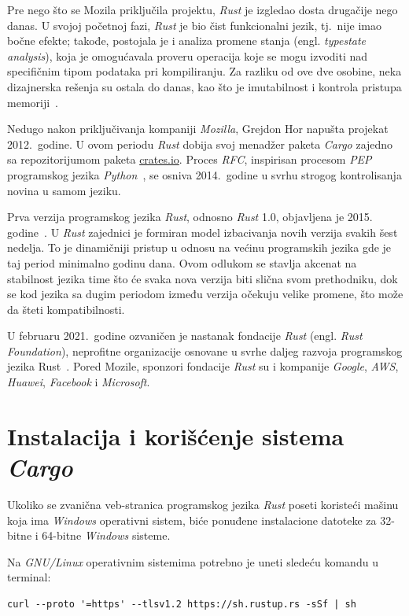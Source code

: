 \documentclass[12pt,oneside]{memoir}
\begin{document}
Pre nego što se Mozila priključila projektu, \emph{Rust} je izgledao dosta
drugačije nego danas. U svojoj početnoj fazi, \emph{Rust} je bio čist funkcionalni jezik,
tj.\ nije imao bočne efekte; takođe, postojala je i analiza promene stanja
(engl. \emph{typestate analysis}), koja je omogućavala proveru operacija
koje se mogu izvoditi nad specifičnim tipom podataka pri kompiliranju. Za
razliku od ove dve osobine, neka dizajnerska rešenja su ostala do danas, kao
što je imutabilnost i kontrola pristupa memoriji~\cite{history_rust}.

Nedugo nakon priključivanja kompaniji \textit{Mozilla}, Grejdon Hor napušta projekat
2012.\ godine. U ovom periodu \emph{Rust} dobija svoj menadžer
paketa \emph{Cargo} zajedno sa repozitorijumom paketa \url{crates.io}.
Proces \emph{RFC}, inspirisan procesom \emph{PEP} programskog jezika
\emph{Python}~\cite{python_pep}, se
osniva 2014.\ godine u svrhu strogog kontrolisanja novina u samom jeziku.

Prva verzija programskog jezika \emph{Rust}, odnosno \emph{Rust} 1.0, objavljena je 2015.
godine~\cite{stable_rust}. U \emph{Rust} zajednici je formiran model izbacivanja novih
verzija svakih šest nedelja. To je dinamičniji pristup
u odnosu na većinu programskih jezika gde je taj period minimalno godinu dana.
Ovom odlukom se stavlja akcenat na stabilnost jezika time što će svaka nova
verzija biti slična svom prethodniku, dok se kod jezika sa dugim periodom
između verzija očekuju velike promene, što može da šteti kompatibilnosti.

U februaru 2021.\ godine ozvaničen je nastanak fondacije \emph{Rust} (engl.
\textit{Rust Foundation}), neprofitne organizacije osnovane u svrhe daljeg razvoja programskog
jezika Rust~\cite{rust_foundation}. Pored Mozile, sponzori fondacije \emph{Rust} su i kompanije
\emph{Google}, \emph{AWS}, \emph{Huawei}, \emph{Facebook} i \emph{Microsoft}.

\section{Instalacija i korišćenje sistema \emph{Cargo}}
Ukoliko se zvanična veb-stranica programskog jezika \emph{Rust} poseti koristeći
mašinu koja ima \emph{Windows} operativni sistem, biće ponuđene
instalacione datoteke za 32-bitne i 64-bitne \emph{Windows} sisteme.

Na \emph{GNU/Linux} operativnim sistemima potrebno je uneti sledeću
komandu u terminal:

\begin{lstlisting}[language={}, style=text]
curl --proto '=https' --tlsv1.2 https://sh.rustup.rs -sSf | sh
\end{lstlisting}
\end{document}
